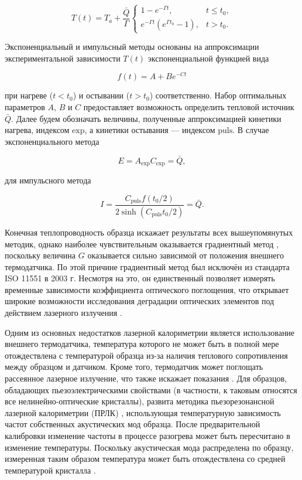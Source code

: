 \documentclass[a4paper,12pt]{article}
\begin{document}
\begin{equation}
	T(t) = T_a + \frac{\bar{Q}}{\Gamma}
	\begin{cases}
		1 - e^{-\Gamma t}, & t \leq t_0, \\
		e^{-\Gamma t}(e^{\Gamma t_0} - 1), & t > t_0.
	\end{cases}
\end{equation}

Экспоненциальный и импульсный методы основаны на аппроксимации экспериментальной зависимости $T(t)$ экспоненциальной функцией вида

\begin{equation}
	f(t) = A + Be^{-Ct}
\end{equation}

при нагреве ($t < t_0$) и остывании ($t > t_0$) соответственно. Набор оптимальных параметров $A$, $B$ и $C$ предоставляет возможность определить тепловой источник $\bar{Q}$. Далее будем обозначать величины, полученные аппроксимацией кинетики нагрева, индексом $\text{exp}$, а кинетики остывания --- индексом $\text{puls}$. В случае экспоненциального метода

\begin{equation}
	E = A_{\text{exp}}C_{\text{exp}} = \bar{Q},
\end{equation}

для импульсного метода

\begin{equation}
	I = \frac{C_{\text{puls}}f(t_0/2)}{2\sinh(C_{\text{puls}}t_0/2)} = \bar{Q}.
\end{equation}

Конечная теплопроводность образца искажает результаты всех вышеупомянутых методик, однако наиболее чувствительным оказывается градиентный метод \cite{Meja1997}, поскольку величина $G$ оказывается сильно зависимой от положения внешнего термодатчика. По этой причине градиентный метод был исключён из стандарта ISO 11551 в 2003 г. Несмотря на это, он единственный позволяет измерять временные зависимости коэффициента оптического поглощения, что открывает широкие возможности исследования деградации оптических элементов под действием лазерного излучения \cite{Zotov2023}.

Одним из основных недостатков лазерной калориметрии является использование внешнего термодатчика, температура которого не может быть в полной мере отождествлена с температурой образца из-за наличия теплового сопротивления между образцом и датчиком. Кроме того, термодатчик может поглощать рассеянное лазерное излучение, что также искажает показания \cite{Willamowski1996}. Для образцов, обладающих пьезоэлектрическими свойствами (в частности, к таковым относятся все нелинейно-оптические кристаллы), развита методика пьезорезонансной лазерной калориметрии (ПРЛК) \cite{Ryabushkin2013}, использующая температурную зависимость частот собственных акустических мод образца. После предварительной калибровки изменение частоты в процессе разогрева может быть пересчитано в изменение температуры. Поскольку акустическая мода распределена по образцу, измеренная таким образом температура может быть отождествлена со средней температурой кристалла \cite{Ryabushkin2013}.
\end{document}
